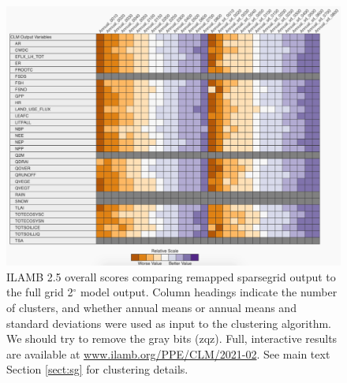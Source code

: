 \documentclass[draft]{agujournal2019}
\begin{document}
\begin{figure}[h]
\centering
\includegraphics[width=42pc]{../figs/supp/ilamb.pdf}
\caption{ILAMB 2.5 overall scores comparing remapped sparsegrid output to the full grid 2$^{\circ}$ model output. Column headings indicate the number of clusters, and whether annual means or annual means and standard deviations were used as input to the clustering algorithm. We should try to remove the gray bits (zqz). Full, interactive results are available at \url{www.ilamb.org/PPE/CLM/2021-02}. See main text Section \ref{sect:sg} for clustering details.}
\label{supp:ilamb}
\end{figure}
\end{document}
